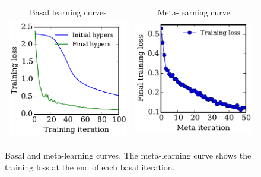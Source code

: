 \documentclass{article}
\newcommand{\primal}{basal }
\newcommand{\Primal}{Basal }
\begin{document}
\begin{figure}[h!]
\begin{center}
\begin{tabular}{cc}
 \Primal{} learning curves & Meta-learning curve \\
\hspace{-1em}\includegraphics[width=0.5\columnwidth, height=0.5\columnwidth]{../experiments/Feb_3_training_schedules/3_adam_50/learning_curves_paper.pdf} &
\hspace{-1em}\includegraphics[width=0.5\columnwidth, height=0.5\columnwidth]{../experiments/Feb_3_training_schedules/3_adam_50/meta_learning_curve_paper.pdf}
\end{tabular}
\vskip -0.1in
\caption{\Primal{} and meta-learning curves.
The meta-learning curve shows the training loss at the end of each \primal{} iteration.}
\label{fig:learning curves}
\end{center}
\vskip -0.2in
\end{figure}
\end{document}
